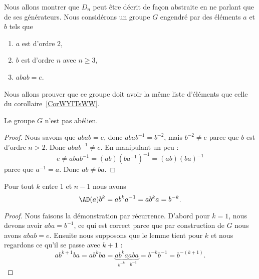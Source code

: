 \begin{normaltext}      \label{NORMooCCUEooRRENed}
    Nous allons montrer que \( D_n\) peut être décrit de façon abstraite en ne parlant que de ses générateurs. Nous considérons un groupe \( G\) engendré par des éléments \( a\) et \( b\) tels que
    \begin{enumerate}
        \item
            \( a\) est d'ordre \( 2\),
        \item
            \( b\) est d'ordre \( n\) avec \( n\geq 3\),
        \item
            \( abab=e\).
    \end{enumerate}
    Nous allons prouver que ce groupe doit avoir la même liste d'éléments que celle du corollaire~\ref{CorWYITsWW}.
\end{normaltext}

\begin{proposition}
    Le groupe \( G\) n'est pas abélien.
\end{proposition}

\begin{proof}
    Nous savons que \( abab=e\), donc \( abab^{-1}=b^{-2}\), mais \( b^{-2}\neq e\) parce que \( b\) est d'ordre \( n>2\). Donc \( abab^{-1}\neq e\). En manipulant un peu :
    \begin{equation}
        e\neq abab^{-1}=(ab)(ba^{-1})^{-1}=(ab)(ba)^{-1}
    \end{equation}
    parce que \( a^{-1}=a\). Donc \( ab\neq ba\).
\end{proof}

\begin{lemma}        \label{LemKKXdqdL}
    Pour tout \( k\) entre \( 1\) et \( n-1\) nous avons
    \begin{equation}
        \AD(a)b^k=ab^ka^{-1}=ab^ka=b^{-k}.
    \end{equation}
\end{lemma}

\begin{proof}
    Nous faisons la démonstration par récurrence. D'abord pour \( k=1\), nous devons avoir \( aba=b^{-1}\), ce qui est correct parce que par construction de \( G\) nous avons \( abab=e\). Ensuite nous supposons que le lemme tient pour \( k\) et nous regardons ce qu'il se passe avec \( k+1\) :
    \begin{equation}
            ab^{k+1}ba=ab^kba=\underbrace{ab^ka}_{b^{-k}}\underbrace{aba}_{b^{-1}}=b^{-k}b^{-1}=b^{-(k+1)}.
    \end{equation}
\end{proof}

